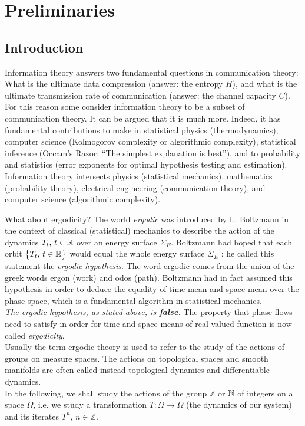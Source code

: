 \chapter{Preliminaries}

\section{Introduction}
Information theory answers two fundamental questions in communication
theory: What is the ultimate data compression (answer: the entropy $H$),
and what is the ultimate transmission rate of communication (answer: the
channel capacity $C$). For this reason some consider information theory
to be a subset of communication theory. It can be argued that it is much more.
Indeed, it has fundamental contributions to make in statistical physics
(thermodynamics), computer science (Kolmogorov complexity or algorithmic complexity), statistical inference (Occam’s Razor: “The simplest
explanation is best”), and to probability and statistics (error exponents for
optimal hypothesis testing and estimation).
\\Information
theory intersects physics (statistical mechanics), mathematics (probability
theory), electrical engineering (communication theory), and computer science (algorithmic complexity). 

What about ergodicity? The world \textit{ergodic} was introduced by L. Boltzmann in the context of classical (statistical) mechanics to describe the action of the dynamics $T_t, \, t \in \mathbb{R}$ over an energy surface $\Sigma_E$. Boltzmann had hoped that each orbit $\big\{ T_t, \, t \in \mathbb{R} \big\}$ would equal the whole energy surface $\Sigma_E$ : he called this statement the \textit{ergodic hypothesis}. The word ergodic comes from the union of the greek words ergon (work) and odos (path). Boltzmann had in fact assumed this hypothesis in order to deduce the equality of time mean and space mean over the phase space, which is a fundamental algorithm in statistical mechanics. 
\\\textit{The ergodic hypothesis, as stated above, is \textbf{false}.} The property that phase flows need to satisfy in order for time and space means of real-valued function is now called \textit{ergodicity}.
\\Usually the term ergodic theory is used to refer to the study of the actions of groups on measure spaces. The actions on topological spaces and smooth manifolds are often called instead topological dynamics and differentiable dynamics. 
\\In the following, we shall study the actions of the group $\mathbb{Z}$ or $\mathbb{N}$ of integers on a space $\Omega$, i.e. we study a transformation $T: \Omega \longrightarrow \Omega$ (the dynamics of our system) and its iterates $T^n$, $n \in \mathbb{Z}$. 

